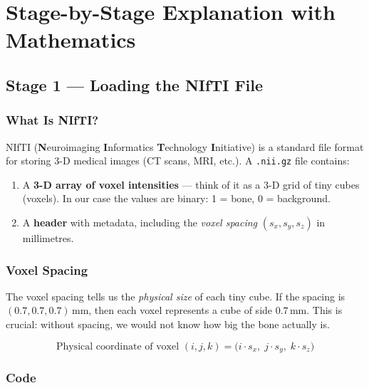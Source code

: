 \documentclass[12pt,a4paper]{article}
\begin{document}
\section{Stage-by-Stage Explanation with Mathematics}

\subsection{Stage 1 — Loading the NIfTI File}

\subsubsection{What Is NIfTI?}

NIfTI (\textbf{N}euroimaging \textbf{I}nformatics \textbf{T}echnology
\textbf{I}nitiative) is a standard file format for storing 3-D medical images
(CT scans, MRI, etc.).  A \texttt{.nii.gz} file contains:

\begin{enumerate}
    \item A \textbf{3-D array of voxel intensities} — think of it as a 3-D grid
          of tiny cubes (voxels).  In our case the values are binary:
          1 = bone, 0 = background.
    \item A \textbf{header} with metadata, including the \emph{voxel spacing}
          $(s_x, s_y, s_z)$ in millimetres.
\end{enumerate}

\subsubsection{Voxel Spacing}

The voxel spacing tells us the \emph{physical size} of each tiny cube.
If the spacing is $(0.7, 0.7, 0.7)$\,mm, then each voxel represents a cube
of side $0.7$\,mm. This is crucial: without spacing, we would not know how big
the bone actually is.

\begin{equation}
    \text{Physical coordinate of voxel } (i,j,k) =
    \bigl(i \cdot s_x,\; j \cdot s_y,\; k \cdot s_z\bigr)
\end{equation}

\subsubsection{Code}
\end{document}
